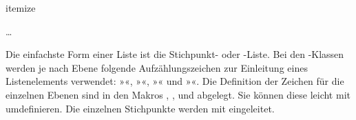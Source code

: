   \begin{Declaration}
    \begin{Environment}{itemize}
      \begin{Body}
         \dots
        \BodyDots
      \end{Body}
    \end{Environment}
  \end{Declaration}%
  Die einfachste
  Form einer Liste ist die Stichpunkt- oder
  -Liste. %
  \iffalse %
  Die Benutzer einer unbeliebten Textverarbeitung nennen diese Form der Liste
  auch gerne \emph{Bulletpoints}. Vermutlich können sie sich nicht vorstellen,
  dass je nach Ebene auch ein anderes Zeichen als ein fetter Punkt zur
  Einleitung eines Stichpunkts verwendet werden kann. %
  \fi%
  Bei den \KOMAScript-Klassen werden je nach Ebene folgende Aufzählungszeichen
  zur Einleitung eines Listenelements verwendet: »{}«,
  »{}«, »{}« und »{}«. Die Definition der
  Zeichen für die einzelnen Ebenen sind in den Makros ,
  ,  und 
  abgelegt. Sie können diese leicht mit  umdefinieren. Die
  einzelnen Stichpunkte werden mit  eingeleitet.%
